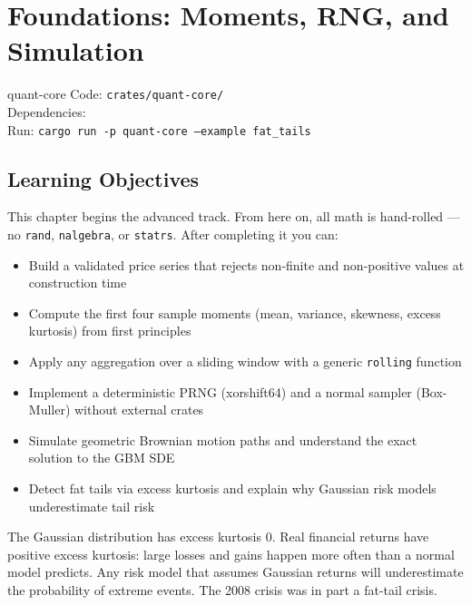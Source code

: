 \chapter{Foundations: Moments, RNG, and Simulation}
\label{ch:moments}

\begin{companioncode}{quant-core}
Code: \texttt{crates/quant-core/}\\
Dependencies: \\
Run: \texttt{cargo run -p quant-core --example fat\_tails}
\end{companioncode}

\section{Learning Objectives}

This chapter begins the advanced track. From here on, all math is hand-rolled ---
no \texttt{rand}, \texttt{nalgebra}, or \texttt{statrs}. After completing it
you can:

\begin{itemize}
    \item Build a validated price series that rejects non-finite and
      non-positive values at construction time
    \item Compute the first four sample moments (mean, variance, skewness,
      excess kurtosis) from first principles
    \item Apply any aggregation over a sliding window with a generic
      \texttt{rolling} function
    \item Implement a deterministic PRNG (xorshift64\*) and a normal sampler
      (Box-Muller) without external crates
    \item Simulate geometric Brownian motion paths and understand the exact
      solution to the GBM SDE
    \item Detect fat tails via excess kurtosis and explain why Gaussian risk
      models underestimate tail risk
\end{itemize}

\begin{keyinsight}
The Gaussian distribution has excess kurtosis $0$. Real financial returns
have positive excess kurtosis: large losses and gains happen more often than
a normal model predicts. Any risk model that assumes Gaussian returns will
underestimate the probability of extreme events. The 2008 crisis was in
part a fat-tail crisis.
\end{keyinsight}


